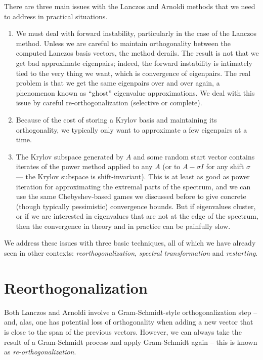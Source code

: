 \documentclass[12pt, leqno]{article} %
\begin{document}
There are three main issues with the Lanczos and Arnoldi methods
that we need to address in practical situations.
\begin{enumerate}
\item
  We must deal with forward instability, particularly in the case of the
  Lanczos method.  Unless we are careful to maintain orthogonality
  between the computed Lanczos basis vectors, the method derails.  The
  result is not that we get bad approximate eigenpairs; indeed, the
  forward instability is intimately tied to the very thing we want,
  which is convergence of eigenpairs.  The real problem is that we get
  the same eigenpairs over and over again, a phenomenon known as
  ``ghost'' eigenvalue approximations.  We deal with this issue by
  careful re-orthogonalization (selective or complete).
\item
  Because of the cost of storing a Krylov basis and maintaining its
  orthogonality, we typically only want to approximate a few eigenpairs
  at a time.
\item
  The Krylov subspace generated by $A$ and some random start
  vector contains iterates of the power method applied to any $A$
  (or to $A-\sigma I$ for any shift $\sigma$ --- the Krylov subspace
  is shift-invariant).  This is at least as good as power iteration
  for approximating the extremal parts of the spectrum, and we can
  use the same Chebyshev-based games we discussed before to
  give concrete (though typically pessimistic) convergence bounds.  But if
  eigenvalues cluster, or if we are interested in eigenvalues that
  are not at the edge of the spectrum, then the convergence in theory
  and in practice can be painfully slow.
\end{enumerate}
We address these issues with three basic techniques, all of which
we have already seen in other contexts: {\em reorthogonalization},
{\em spectral transformation} and {\em restarting}.

\section{Reorthogonalization}

Both Lanczos and Arnoldi involve a Gram-Schmidt-style
orthogonalization step -- and, alas, one has potential loss of
orthogonality when adding a new vector that is close to the span of
the previous vectors.  However, we can always take the result of a
Gram-Schmidt process and apply Gram-Schmidt again -- this is known as
{\em re-orthogonalization}.
\end{document}
